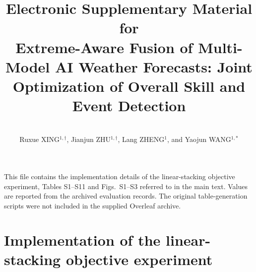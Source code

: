 \documentclass[12pt]{article}
\begin{document}
\title{\vspace*{-20mm}\fontsize{12}{12}\bf
Electronic Supplementary Material for\\
Extreme-Aware Fusion of Multi-Model AI Weather Forecasts: Joint Optimization of Overall Skill and Event Detection
\vspace*{-3mm}}
\date{}
\author{\\[-17mm]\fontsize{12}{12}
Ruxue XING$^{1,\dagger}$, Jianjun ZHU$^{1,\dagger}$,
Lang ZHENG$^{1}$, and Yaojun WANG$^{1,*}$}
\maketitle

\begingroup
\renewcommand{\thefootnote}{}
\endgroup


\noindent This file contains the implementation details of the linear-stacking objective experiment, Tables S1--S11 and Figs.~S1--S3 referred to in the main text. Values are reported from the archived evaluation records. The original table-generation scripts were not included in the supplied Overleaf archive.

\section{Implementation of the linear-stacking objective experiment}
\end{document}
